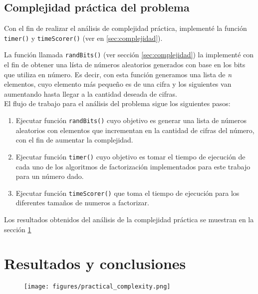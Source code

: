 \documentclass{article}
\begin{document}
\subsection{Complejidad práctica del problema}

Con el fin de realizar el análisis de complejidad práctica, implementé la
función \texttt{timer()} y \texttt{timeScorer()} (ver en \ref{sec:complejidad}).

La función llamada \texttt{randBits()} (ver sección \ref{sec:complejidad}) la
implementé con el fin de obtener una lísta de números aleatorios generados con
base en los bits que utiliza en número. Es decir, con esta función generamos una
lista de \textit{n} elementos, cuyo elemento más pequeño es de una cifra y los
siguientes van aumentando hasta llegar a la cantidad deseada de cifras.\\

El flujo de trabajo para el análisis del problema sigue los siguientes pasos:

\begin{enumerate}

\item Ejecutar función \texttt{randBits()} cuyo objetivo es generar una lista de
números aleatorios con elementos que incrementan en la cantidad de cifras del
número, con el fin de aumentar la complejidad.
\item Ejecutar función \texttt{timer()} cuyo objetivo es tomar el tiempo de
ejecución de cada uno de los algoritmos de factorización implementados para este
trabajo para un número dado.
\item Ejecutar función \texttt{timeScorer()} que toma el tiempo de ejecución
para los diferentes tamaños de numeros a factorizar.
\end{enumerate}
    

Los resultados obtenidos del análisis de la complejidad práctica se muestran en
la sección \ref{sec:resultados}


\section{Resultados y conclusiones} \label{sec:resultados}

\begin{figure}[H]
        \texttt{[image: figures/practical\_complexity.png]}
    \caption{}
\end{figure}


 

\end{document}
